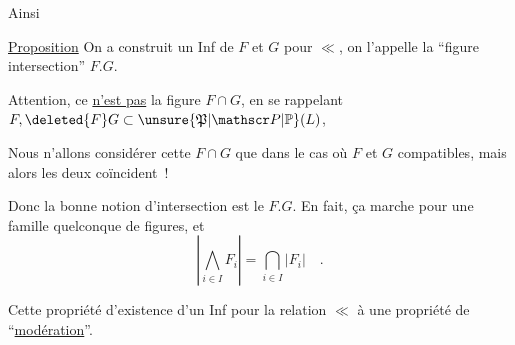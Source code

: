 

Ainsi

\uline{Proposition} On a construit un Inf de $F$ et $G$ pour $\ll$, on l'appelle la ``figure intersection'' $F.G$.

Attention, ce \uline{n'est pas}  la figure $F\cap G$,  en se rappelant $F,\deleted{F}G\subset\unsure{\mathfrak P|\mathscr P|\mathbb P}(L)$, 

Nous n'allons considérer cette $F\cap G$ que dans le cas où $F$ et $G$ compatibles, mais alors les deux coïncident~!

Donc la bonne notion d'intersection est le $F.G$. En fait, ça marche pour une famille quelconque de figures, et
\[
 \left|\bigwedge_{i\in I} F_i\right|=\bigcap_{i\in I}|F_i|\quad .
\]

Cette propriété d'existence d'un Inf pour la relation $\ll$   à une propriété de ``\uline{modération}''.

